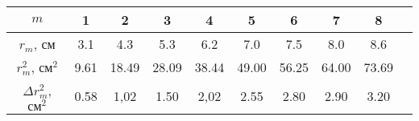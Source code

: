 \begin{tabular}{|c|c|c|c|c|c|c|c|c|c|}
\hline
$m$& 1	& 2 &3 & 4 &	5 &	6 &	7 &	8\\
\hline
$r_m$, $\textbf{см}$&  3.1 & 4.3 & 5.3 & 6.2 & 7.0 & 7.5 & 8.0 & 8.6   \\
\hline
$r_m^2$, $\textbf{см}^2$& 9.61 & 18.49 & 28.09 &	38.44 &	49.00 &	56.25 &	64.00 &	73.69\\
\hline
$\Delta r_m^2$, $\textbf{см}^2$& 0.58 &	1,02	& 1.50	& 2,02&	2.55 &	2.80 &	2.90 &	3.20\\
\hline
\end{tabular}





			